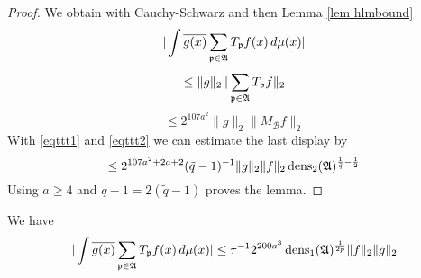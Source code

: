 \begin{proof}
We obtain with Cauchy-Schwarz
and then Lemma \ref{lem hlmbound}
    \begin{equation}
    |\int \overline{g(x)} \sum_{\mathfrak p \in \mathfrak{A}} T_{\mathfrak p} f(x)\, d\mu(x)|
\end{equation}
    \begin{equation}
    \le \|g\|_2 \| \sum_{\mathfrak p \in \mathfrak{A}} T_{\mathfrak p} f \|_2
\end{equation}
    \begin{equation}
    \le 2^{107a^2}\|g\|_2 \|  M_{\mathcal{B}}f \|_2
\end{equation}
With \eqref{eqttt1} and
\eqref{eqttt2} we can estimate the last display by
\begin{equation}
    \le 2^{107a^2+2a+2}(\tilde{q}-1)^{-1} \|g\|_2 \|f\|_2\operatorname{\operatorname{dens}}_2(\mathfrak{A})^{\frac 1{\tilde{q}}-\frac 12}
\end{equation}
Using $a\ge 4$ and
$q-1=2(\tilde{q}-1)$
proves the lemma.
\end{proof}




\begin{lemma}\label{lem decay n}
    We have
    \begin{equation}\label{eqttt3}
    |\int \overline{g(x)} \sum_{\mathfrak p \in \mathfrak{A}} T_{\mathfrak p} f(x)\, d\mu(x)|\le
    \tau^{-1}2^{200a^3}\operatorname{\operatorname{dens}}_1(\mathfrak{A})^{\frac 1{2p}} \|f\|_2\|g\|_2
\end{equation}
\end{lemma}



